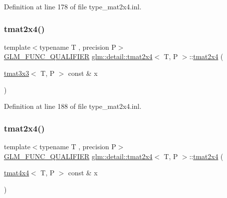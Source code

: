 Definition at line 178 of file type\+\_\+mat2x4.\+inl.

\mbox{\label{structglm_1_1detail_1_1tmat2x4_a5b2e53893c5960805f0315217f4fc5e9}} 
\subsubsection{\texorpdfstring{tmat2x4()}{tmat2x4()}\hspace{0.1cm}{\footnotesize\ttfamily [12/22]}}
{\footnotesize\ttfamily template$<$typename T , precision P$>$ \\
\hyperlink{setup_8hpp_a33fdea6f91c5f834105f7415e2a64407}{G\+L\+M\+\_\+\+F\+U\+N\+C\+\_\+\+Q\+U\+A\+L\+I\+F\+I\+ER} \hyperlink{structglm_1_1detail_1_1tmat2x4}{glm\+::detail\+::tmat2x4}$<$ T, P $>$\+::\hyperlink{structglm_1_1detail_1_1tmat2x4}{tmat2x4} (\begin{DoxyParamCaption}\item[{\hyperlink{structglm_1_1detail_1_1tmat3x3}{tmat3x3}$<$ T, P $>$ const \&}]{x }\end{DoxyParamCaption})\hspace{0.3cm}{\ttfamily [explicit]}}



Definition at line 188 of file type\+\_\+mat2x4.\+inl.

\mbox{\label{structglm_1_1detail_1_1tmat2x4_aab92f80bbe5811c595f4c55ed1c7d186}} 
\subsubsection{\texorpdfstring{tmat2x4()}{tmat2x4()}\hspace{0.1cm}{\footnotesize\ttfamily [13/22]}}
{\footnotesize\ttfamily template$<$typename T , precision P$>$ \\
\hyperlink{setup_8hpp_a33fdea6f91c5f834105f7415e2a64407}{G\+L\+M\+\_\+\+F\+U\+N\+C\+\_\+\+Q\+U\+A\+L\+I\+F\+I\+ER} \hyperlink{structglm_1_1detail_1_1tmat2x4}{glm\+::detail\+::tmat2x4}$<$ T, P $>$\+::\hyperlink{structglm_1_1detail_1_1tmat2x4}{tmat2x4} (\begin{DoxyParamCaption}\item[{\hyperlink{structglm_1_1detail_1_1tmat4x4}{tmat4x4}$<$ T, P $>$ const \&}]{x }\end{DoxyParamCaption})\hspace{0.3cm}{\ttfamily [explicit]}}



